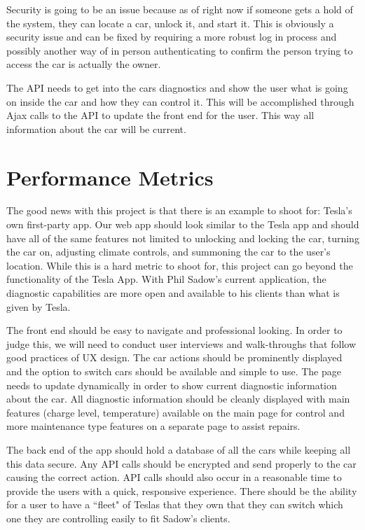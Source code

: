 \documentclass[onecolumn, draftclsnofoot,10pt, compsoc]{IEEEtran}
\begin{document}
Security is going to be an issue because as of right now if someone gets a hold of the system, they can locate a car, unlock it, and start it.
This is obviously a security issue and can be fixed by requiring a more robust log in process and possibly another way of in person authenticating to confirm the person trying to access the car is actually the owner.

The API needs to get into the cars diagnostics and show the user what is going on inside the car and how they can control it.
This will be accomplished through Ajax calls to the API to update the front end for the user.
This way all information about the car will be current.

\section{Performance Metrics}
The good news with this project is that there is an example to shoot for: Tesla's own first-party app.
Our web app should look similar to the Tesla app and should have all of the same features not limited to unlocking and locking the car, turning the car on, adjusting climate controls, and summoning the car to the user’s location.
While this is a hard metric to shoot for, this project can go beyond the functionality of the Tesla App.
With Phil Sadow's current application, the diagnostic capabilities are more open and available to his clients than what is given by Tesla.

The front end should be easy to navigate and professional looking.
In order to judge this, we will need to conduct user interviews and walk-throughs that follow good practices of UX design. 
The car actions should be prominently displayed and the option to switch cars should be available and simple to use.
The page needs to update dynamically in order to show current diagnostic information about the car.
All diagnostic information should be cleanly displayed with main features (charge level, temperature) available on the main page for control and more maintenance type features on a separate page to assist repairs.

The back end of the app should hold a database of all the cars while keeping all this data secure.
Any API calls should be encrypted and send properly to the car causing the correct action.
API calls should also occur in a reasonable time to provide the users with a quick, responsive experience.
There should be the ability for a user to have a ``fleet" of Teslas that they own that they can switch which one they are controlling easily to fit Sadow's clients.



\end{document}
